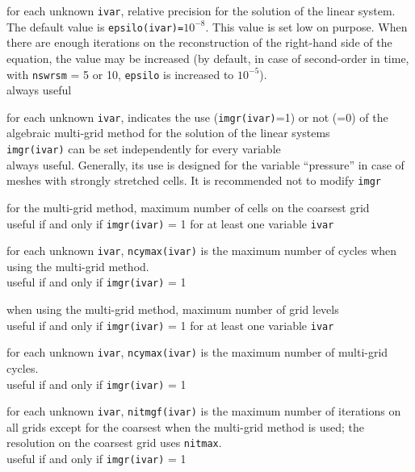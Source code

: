 {for each unknown {\tt ivar}, relative precision for the solution of the linear
system. The default value is {\tt epsilo(ivar)=$10^{-8}$}. This value is set low
on purpose. When there are enough iterations on the reconstruction of the
right-hand side of the equation,
the value may be increased (by default, in case of second-order in time,
with {\tt nswrsm} = 5 or 10, {\tt epsilo} is increased to $10^{-5}$).\\
always useful}

{for each unknown {\tt ivar}, indicates the use ({\tt imgr(ivar)}=1) or not
(=0) of the algebraic multi-grid method for the solution of the linear systems\\
{\tt imgr(ivar)} can be set independently for every variable\\
always useful. Generally, its use is designed for the variable ``pressure'' in
case of meshes with strongly stretched cells. It is recommended not to modify
{\tt imgr}}

{for the multi-grid method, maximum number of cells on the coarsest grid\\
useful if and only if {\tt imgr(ivar)} = 1 for at least one variable {\tt ivar}}

{for each unknown {\tt ivar}, {\tt ncymax(ivar)} is the maximum number of
cycles when using the multi-grid method.\\
useful if and only if {\tt imgr(ivar)} = 1}

{when using the multi-grid method, maximum number of grid levels\\
useful if and only if {\tt imgr(ivar)} = 1 for at least one variable {\tt ivar}}

{for each unknown {\tt ivar}, {\tt ncymax(ivar)} is the maximum number of
 multi-grid cycles.\\
useful if and only if {\tt imgr(ivar)} = 1}

{for each unknown {\tt ivar}, {\tt nitmgf(ivar)} is the maximum number of
iterations on all grids except for the coarsest when the multi-grid method is
used; the resolution on the coarsest grid uses {\tt nitmax}.\\
useful if and only if {\tt imgr(ivar)} = 1}

